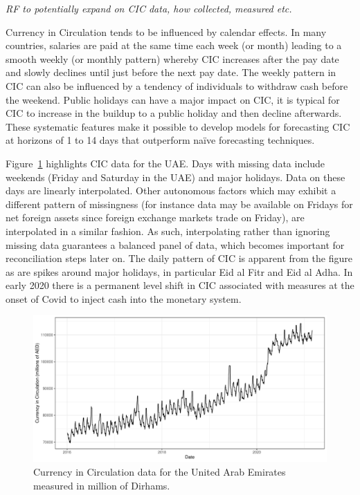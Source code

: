 \documentclass{article}
\begin{document}
\textit{\color{blue} RF to potentially expand on CIC data, how collected, measured etc.}

Currency in Circulation tends to be influenced by calendar effects. In many countries, salaries are paid at the same time each week (or month) leading to a smooth weekly (or monthly pattern) whereby CIC increases after the pay date and slowly declines until just before the next pay date. The weekly pattern in CIC can also be influenced by a tendency of individuals to withdraw cash before the weekend. Public holidays can have a major impact on CIC, it is typical for CIC to increase in the buildup to a public holiday and then decline afterwards. These systematic features make it possible to develop models for forecasting CIC at horizons of 1 to 14 days that outperform na\"ive forecasting techniques.

Figure~\ref{fig:cicdata} highlights CIC data for the UAE. Days with missing data include weekends (Friday and Saturday in the UAE) and major holidays. Data on these days are linearly interpolated. Other autonomous factors which may exhibit a different pattern of missingness (for instance data may be available on Fridays for net foreign assets since foreign exchange markets trade on Friday), are interpolated in a similar fashion. As such, interpolating rather than ignoring missing data guarantees a balanced panel of data, which becomes important for reconciliation steps later on. The daily pattern of CIC is apparent from the figure as are spikes around major holidays, in particular Eid al Fitr and Eid al Adha. In early 2020 there is a permanent level shift in CIC associated with measures at the onset of Covid to inject cash into the monetary system.

\begin{figure}[!h]
    \centering
    \includegraphics[scale=0.6]{cicplot}
    \caption{Currency in Circulation data for the United Arab Emirates measured in million of Dirhams.}
    \label{fig:cicdata}
\end{figure}
\end{document}
